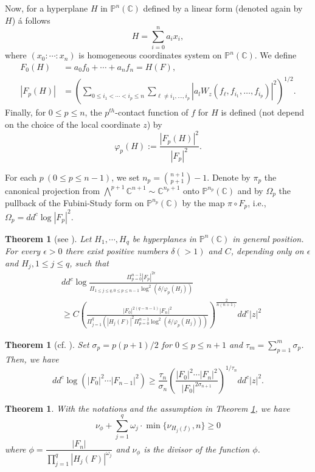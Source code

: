 \documentclass[12pt,article]{amsart}
\newtheorem{theorem}[equation]{Theorem}
\newcommand{\C}{{\mathbb{C}}}
\renewcommand{\P}{{\mathbb{P}}}
\numberwithin{equation}{section}
\begin{document}
Now, for a hyperplane $H$ in $\P^n(\C)$ defined by a linear form (denoted again by $H$) á follows
$$H=\sum_{i=0}^na_ix_i,$$
where $(x_0:\cdots:x_n)$ is homogeneous coordinates system on $\P^n(\C)$. We define
\begin{align*}
F_{0}(H)&=a_0f_0+\cdots+a_nf_n=H(F),\\ 
|F_{p}(H)|&=\left (\sum_{0\le i_1<\cdots<i_p\le n}\sum_{\ell\ne i_1,\ldots,i_p}\left |a_lW_z(f_\ell,f_{i_1},\ldots,f_{i_p})\right|^2\right)^{1/2}.
\end{align*}
Finally, for $0\le p\le n$, the $p^{th}$-contact function of $f$ for $H$ is defined (not depend on the choice of the local coordinate $z$) by
$$\varphi_{p}(H):=\dfrac{|F_{p}(H)|^2}{|F_{p}|^2}.$$

For each $p\ (0\le p\le n-1)$, we set $n_p=\binom{n+1}{p+1}-1$. Denote by $\pi_p$ the canonical projection from $\bigwedge^{p+1}\C^{n+1}\sim\C^{n_p+1}$ onto $\P^{n_p}(\C)$ and by $\Omega_p$ the pullback of the Fubini-Study form on $\P^{n_p}(\C)$ by the map $\pi\circ F_{p}$, i.e., $\Omega_p = dd^c\log |F_{p}|^2$. 

\begin{theorem}[{see \cite[Theorem 2.5.3]{Fu90}}]\label{thm3.3}
Let $H_1, \cdots, H_q$ be hyperplanes in $\mathbb{P}^n(\mathbb{C})$ in general position. For every $\epsilon>0$ there exist positive numbers $\delta(>1)$ and $C$, depending only on $\epsilon$ and $H_j, 1 \leq j \leq q$, such that
\begin{align*}
&dd^c \log \frac{\Pi_{p=0}^{n-1}\left|F_p\right|^{2 \epsilon}}{\Pi_{1 \leq j \leq q, 0 \leq p \leq n-1} \log ^{2}\left(\delta / \varphi_p\left(H_j\right)\right)}\\
&\geq C\left(\frac{\left|F_0\right|^{2(q-n-1)}\left|F_n\right|^2}{\Pi_{j=1}^q\left(\left|H_j\left(F\right)\right|^2 \Pi_{p=0}^{n-1} \log ^2\left(\delta / \varphi_p\left(H_j\right)\right)\right)}\right)^{\frac{2}{n(n+1)}} dd^c|z|^2
\end{align*}
\end{theorem}

\begin{theorem}[{cf. \cite[Proposition 2.5.7]{Fu93}}]\label{thm3.4}
Set $\sigma_p=p(p+1)/2$ for $0\le p\le n+1$ and $\tau_m=\sum_{p=1}^m\sigma_p$. Then, we have
$$ dd^c\log(|F_{0}|^2\cdots |F_{n-1}|^2)\ge\dfrac{\tau_n}{\sigma_n}\left(\dfrac{|F_{0}|^2\cdots |F_{n}|^2}{|F_{0}|^{2\sigma_{n+1}}}\right)^{1/\tau_n}dd^c|z|^2. $$
\end{theorem}

\begin{theorem}\label{thm3.5}
With the notations and the assumption in Theorem \ref{thm3.3}, we have
$$ \nu_{\phi}+\sum_{j=1}^q\omega_j\cdot\min\{\nu_{H_j(f)},n\}\ge 0 $$
where $\phi=\dfrac{|F_n|}{\prod_{j=1}^q|H_j(F)|^{\omega_j}}$ and $\nu_\phi$ is the divisor of the function $\phi$.
\end{theorem}
\end{document}
